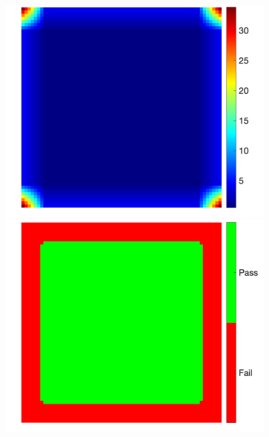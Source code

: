 \documentclass[fleqn,a4paper,oneside,openany]{book}
\begin{document}
\begin{figure}[!t]
\begin{minipage}[b]{0.45\textwidth}
   \end{minipage}
      \begin{minipage}[b]{0.45\textwidth}
     \centering
     \includegraphics[trim = 0 0 0 0, clip, scale=0.40]{example_1a1_diff.png}
   \end{minipage}
   \begin{minipage}[b]{0.45\textwidth}
     \centering
     \includegraphics[trim = 0 0 0 0, clip, scale=0.40]{example_1a1_GM.png}

\end{minipage}
\end{figure}
\end{document}
